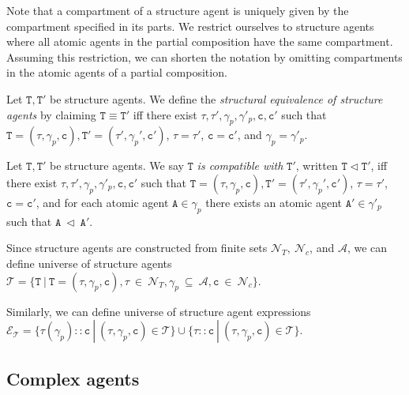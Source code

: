 \documentclass{entcs}
\renewcommand{\~}[0]{\texttildelow}
\begin{document}
Note that a compartment of a structure agent is uniquely given by the compartment specified in its parts. We restrict ourselves to structure agents where all atomic agents in the partial composition have the same compartment. Assuming this restriction, we can shorten the notation by omitting compartments in the atomic agents of a partial composition. 

\begin{defn}
Let $\mathtt{T},\mathtt{T}'$ be structure agents. We define the \emph{structural equivalence of structure agents} by claiming $\mathtt{T}\equiv\mathtt{T}'$ iff there exist $\tau,\tau',\gamma_p,\gamma'_p,\mathtt{c},\mathtt{c}'$ such that $\mathtt{T}=(\tau, \gamma_p, \mathtt{c}),\mathtt{T}'=(\tau', \gamma_p', \mathtt{c}')$, $\tau=\tau'$, $\mathtt{c} = \mathtt{c}'$, and $\gamma_p=\gamma'_p$.
\end{defn}

\begin{defn}
Let $\mathtt{T},\mathtt{T}'$ be structure agents. We say $\mathtt{T}$ \emph{is compatible with} $\mathtt{T}'$, written $\mathtt{T} \lhd \mathtt{T}'$, iff there exist $\tau,\tau',\gamma_p,\gamma'_p,\mathtt{c},\mathtt{c}'$ such that $\mathtt{T}=(\tau, \gamma_p, \mathtt{c}),\mathtt{T}'=(\tau', \gamma_p', \mathtt{c}')$, $\tau = \tau'$, $\mathtt{c} = \mathtt{c}'$, and for each atomic agent $\mathtt{A} \in \gamma_p$ there exists an atomic agent $\mathtt{A}' \in \gamma'_p$ such that $\mathtt{A}~\lhd~\mathtt{A}'$. 
\end{defn}

\begin{theorem}
Since structure agents are constructed from finite sets $\mathcal{N}_{T},~\mathcal{N}_{c}$, and $\mathcal{A}$, we can define universe of structure agents $\mathcal{T} = \{ \mathtt{T}~|~\mathtt{T} = (\tau, \gamma_p, \mathtt{c}), \tau~\in~\mathcal{N}_{T}, \gamma_p~\subseteq~\mathcal{A},  \mathtt{c}~\in~\mathcal{N}_{c} \}$.

\noindent Similarly, we can define universe of structure agent expressions\\ $\mathcal{E}_\mathcal{T} = \{ \tau(\gamma_p)::\mathtt{c} ~|~ (\tau, \gamma_p, \mathtt{c}) \in \mathcal{T} \} \cup \{ \tau::\mathtt{c} ~|~ (\tau, \gamma_p, \mathtt{c}) \in \mathcal{T} \}$.
\end{theorem}

\subsection{Complex agents}
\end{document}
